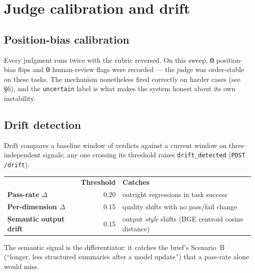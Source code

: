 \documentclass[11pt]{article}
\begin{document}
\begin{center}
\end{center}

\section{Judge calibration and drift}
\subsection{Position-bias calibration}
Every judgment runs twice with the rubric reversed. On this sweep, \textbf{0} position-bias
flips and \textbf{0} human-review flags were recorded --- the judge was order-stable on these
tasks. The mechanism nonetheless fired correctly on harder cases (see \S6), and the
\texttt{uncertain} label is what makes the system honest about its own instability.

\subsection{Drift detection}
Drift compares a baseline window of verdicts against a current window on three independent
signals; any one crossing its threshold raises \texttt{drift\_detected} (\texttt{POST /drift}).

\begin{center}
\begin{tabular}{@{}>{\bfseries}p{4.8cm} r p{7.2cm}@{}}
\toprule
\rowcolor{headerbg}\multicolumn{1}{@{}>{\bfseries\color{white}}l}{Signal} & \color{white}\bfseries Threshold & \color{white}\bfseries Catches \\
Pass-rate $\Delta$ & 0.20 & outright regressions in task success \\
Per-dimension $\Delta$ & 0.15 & quality shifts with no pass/fail change \\
Semantic output drift & 0.15 & output \emph{style} shifts (BGE centroid cosine distance) \\
\bottomrule
\end{tabular}
\end{center}
The semantic signal is the differentiator: it catches the brief's Scenario~B (``longer, less
structured summaries after a model update'') that a pass-rate alone would miss.
\end{document}
